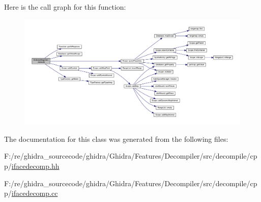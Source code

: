 Here is the call graph for this function\+:
\nopagebreak
\begin{figure}[H]
\begin{center}
\leavevmode
\includegraphics[width=350pt]{class_ifc_global_registers_a664345c70b1ae67ce6140acad8de4491_cgraph}
\end{center}
\end{figure}


The documentation for this class was generated from the following files\+:\begin{DoxyCompactItemize}
\item 
F\+:/re/ghidra\+\_\+sourcecode/ghidra/\+Ghidra/\+Features/\+Decompiler/src/decompile/cpp/\mbox{\hyperlink{ifacedecomp_8hh}{ifacedecomp.\+hh}}\item 
F\+:/re/ghidra\+\_\+sourcecode/ghidra/\+Ghidra/\+Features/\+Decompiler/src/decompile/cpp/\mbox{\hyperlink{ifacedecomp_8cc}{ifacedecomp.\+cc}}\end{DoxyCompactItemize}
